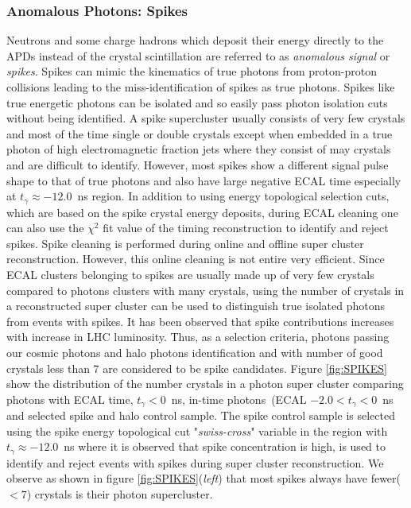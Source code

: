 \subsubsection{Anomalous Photons: Spikes}
Neutrons and some charge hadrons which deposit their energy directly to the APDs instead of the crystal scintillation are referred to as \textit{anomalous signal} or \textit{spikes}. Spikes can mimic the kinematics of true photons from proton-proton collisions  leading to the miss-identification of spikes as true photons. Spikes like true energetic photons can be isolated and so easily pass photon isolation cuts without being identified. A spike supercluster usually consists of very few crystals and most of the time single or double crystals except when embedded in a true photon of high electromagnetic fraction jets where they consist of may crystals and are difficult to identify. However, most spikes show a different signal pulse shape to that of true photons and also have large negative ECAL time especially at $t_{\gamma} \approx -12.0$~ns region. In addition to using energy topological selection cuts, which are based on the spike crystal energy deposits, during ECAL cleaning one can also use the $\chi^{2}$ fit value of the timing reconstruction to identify and reject spikes. Spike cleaning is performed during online and offline super cluster reconstruction. However, this online cleaning is not entire very efficient. Since ECAL clusters belonging to spikes are usually made up of very few crystals compared to photons clusters with many crystals, using the number of crystals in a reconstructed super cluster can be used to distinguish true isolated photons from events with spikes. It has been observed that spike contributions increases with increase in LHC luminosity. Thus, as a selection criteria, photons passing our cosmic photons and halo photons identification and with number of good crystals less than $7$ are considered to be spike candidates. Figure \ref{fig:SPIKES} show the distribution of the number crystals in a photon super cluster comparing photons with ECAL time, $ t_{\gamma} < 0$~ns, in-time photons~(ECAL $ -2.0 < t_{\gamma} < 0$~ns and  selected spike and halo control sample. The spike control sample is selected using the spike energy topological cut "\textit{swiss-cross}" variable in the region with $t_{\gamma} \approx -12.0$~ns where it is observed that spike concentration is high, is used to identify and reject events with spikes during super cluster reconstruction. We observe as shown in figure \ref{fig:SPIKES}(\textit{left}) that most spikes always have fewer($ < 7$) crystals is their photon supercluster.

